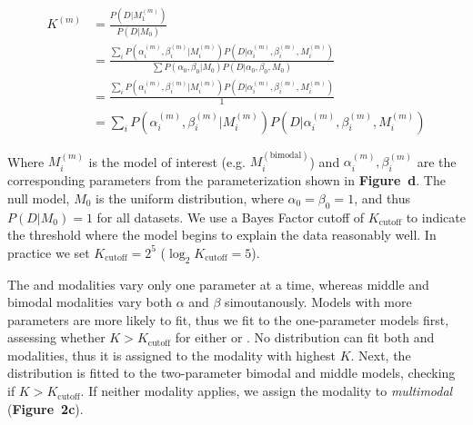 \begin{align}
K^{(m)}
&= \frac{P(D | M_1^{(m)})}{P(D | M_0)}\\
&=
\frac{\sum_{i} P(\alpha_i^{(m)}, \beta_i^{(m)} | M_i^{(m)}) P(D | \alpha_i^{(m)}, \beta_i^{(m)}, M_i^{(m)})}
{\sum P(\alpha_0, \beta_0 | M_0) P(D | \alpha_0, \beta_0, M_0)}\\
&=
\frac{\sum_{i} P(\alpha_i^{(m)}, \beta_i^{(m)} | M_i^{(m)}) P(D | \alpha_i^{(m)}, \beta_i^{(m)}, M_i^{(m)})}
{1}\\
&=
\sum_{i} P(\alpha_i^{(m)}, \beta_i^{(m)} | M_i^{(m)}) P(D | \alpha_i^{(m)}, \beta_i^{(m)}, M_i^{(m)})
\end{align}

Where $M_i^{(m)}$ is the model of interest (e.g. $M_i^{(\mathrm{bimodal})}$) and $\alpha_i^{(m)}, \beta_i^{(m)}$ are the corresponding parameters from the parameterization shown in \textbf{Figure~d}. The null model, $M_0$ is the uniform distribution, where $\alpha_0 = \beta_0 = 1$, and thus $P(D|M_0) = 1$ for all datasets. We use a Bayes Factor cutoff of $K_{\mathrm{cutoff}}$ to indicate the threshold where the model begins to explain the data reasonably well. In practice we set $K_{\mathrm{cutoff}} = 2^{5}$ ($\log_2 K_\mathrm{cutoff} = 5$).

The \0 and \1 modalities vary only one parameter at a time, whereas middle and bimodal modalities vary both $\alpha$ and $\beta$ simoutanously. Models with more parameters are more likely to fit, thus we fit to the one-parameter models first, assessing whether $K > K_{\mathrm{cutoff}}$ for either \0 or \1. No distribution can fit both \0 and \1 modalities, thus it is assigned to the modality with highest $K$. Next, the distribution is fitted to the two-parameter bimodal and middle models, checking if $K > K_{\mathrm{cutoff}}$. If neither modality applies, we assign the modality to \emph{multimodal} (\textbf{Figure~2c}).


